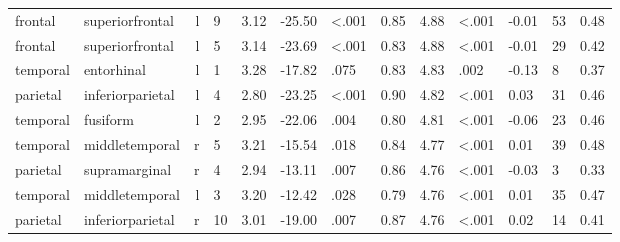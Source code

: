 \documentclass{article}
\begin{document}
\begin{longtable}{llrR{1.3cm}R{1cm}R{1.3cm}R{1cm}R{1cm}R{1.3cm}R{1cm}R{1.8cm}R{1.3cm}R{1.8cm}}
   frontal &           superiorfrontal &    l &         9 &                  3.12 &           -25.50 &      \textless.001 &                               0.85 &                          4.88 &                   \textless.001 &  -0.01 &     53 &      0.48 \\
   frontal &           superiorfrontal &    l &         5 &                  3.14 &           -23.69 &      \textless.001 &                               0.83 &                          4.88 &                   \textless.001 &  -0.01 &     29 &      0.42 \\
  temporal &                entorhinal &    l &         1 &                  3.28 &           -17.82 &               .075 &                               0.83 &                          4.83 &                            .002 &  -0.13 &      8 &      0.37 \\
  parietal &          inferiorparietal &    l &         4 &                  2.80 &           -23.25 &      \textless.001 &                               0.90 &                          4.82 &                   \textless.001 &   0.03 &     31 &      0.46 \\
  temporal &                  fusiform &    l &         2 &                  2.95 &           -22.06 &               .004 &                               0.80 &                          4.81 &                   \textless.001 &  -0.06 &     23 &      0.46 \\
  temporal &            middletemporal &    r &         5 &                  3.21 &           -15.54 &               .018 &                               0.84 &                          4.77 &                   \textless.001 &   0.01 &     39 &      0.48 \\
  parietal &             supramarginal &    r &         4 &                  2.94 &           -13.11 &               .007 &                               0.86 &                          4.76 &                   \textless.001 &  -0.03 &      3 &      0.33 \\
  temporal &            middletemporal &    l &         3 &                  3.20 &           -12.42 &               .028 &                               0.79 &                          4.76 &                   \textless.001 &   0.01 &     35 &      0.47 \\
  parietal &          inferiorparietal &    r &        10 &                  3.01 &           -19.00 &               .007 &                               0.87 &                          4.76 &                   \textless.001 &   0.02 &     14 &      0.41 \\

\end{longtable}
\end{document}
